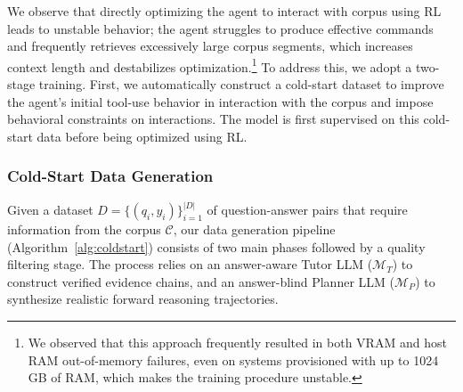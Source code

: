 \documentclass{llmxive}
\begin{document}
We observe that directly optimizing the agent to interact with corpus using RL leads to unstable behavior; the agent struggles to produce effective commands and frequently retrieves excessively large corpus segments, which increases context length and destabilizes optimization.\footnote{We observed that this approach frequently resulted in both VRAM and host RAM out-of-memory failures, even on systems provisioned with up to 1024\,GB of RAM, which makes the training procedure unstable.} To address this, we adopt a two-stage training. First, we automatically construct a cold-start dataset to improve the agent’s initial tool-use behavior in interaction with the corpus and impose behavioral constraints on interactions. The model is first supervised on this cold-start data before being optimized using RL.

\subsubsection{Cold-Start Data Generation}

Given a dataset $D=\{(q_i, y_i)\}_{i=1}^{|D|}$  of question-answer pairs that require information from the corpus $\mathcal{C}$, our data generation pipeline (Algorithm~\ref{alg:coldstart}) consists of two main phases followed by a quality filtering stage. The process relies on an answer-aware Tutor LLM ($\mathcal{M}_{T}$) to construct verified evidence chains, and an answer-blind Planner LLM ($\mathcal{M}_{P}$) to synthesize realistic forward reasoning trajectories.
\end{document}
